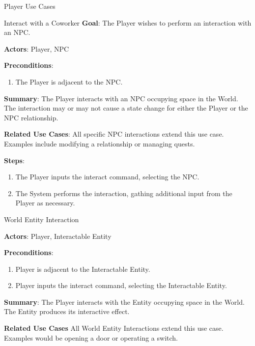 \documentclass[12pt]{report}
\begin{document}
\begin{section}{Player Use Cases}
    \begin{subsection}{Interact with a Coworker}
      \textbf{Goal}:
      The Player wishes to perform an interaction with an NPC.
      
      \textbf{Actors}:
      Player, NPC

      \textbf{Preconditions}:
      \begin{enumerate}
        \item The Player is adjacent to the NPC.
      \end{enumerate}

      \textbf{Summary}:
      The Player interacts with an NPC occupying space in the World. The
      interaction may or may not cause a state change for either the Player or
      the NPC relationship.

      \textbf{Related Use Cases}:
      All specific NPC interactions extend this use case. Examples include
      modifying a relationship or managing quests.

      \textbf{Steps}:
      \begin{enumerate}
        \item The Player inputs the interact command, selecting the NPC.
        \item The System performs the interaction, gathing additional input from the
	      Player as necessary.
      \end{enumerate}
    \end{subsection}


    \begin{subsection}{World Entity Interaction}

      \textbf{Actors}:
      Player, Interactable Entity

      \textbf{Preconditions}:
      \begin{enumerate}
        \item Player is adjacent to the Interactable Entity.
        \item Player inputs the interact command, selecting the Interactable Entity.
      \end{enumerate}

      \textbf{Summary}:
      The Player interacts with the Entity occupying space in the World. The Entity 
      produces its interactive effect. 

      \textbf{Related Use Cases}
      All World Entity Interactions extend this use case. Examples would be 
      opening a door or operating a switch.


\end{subsection}
\end{section}
\end{document}
